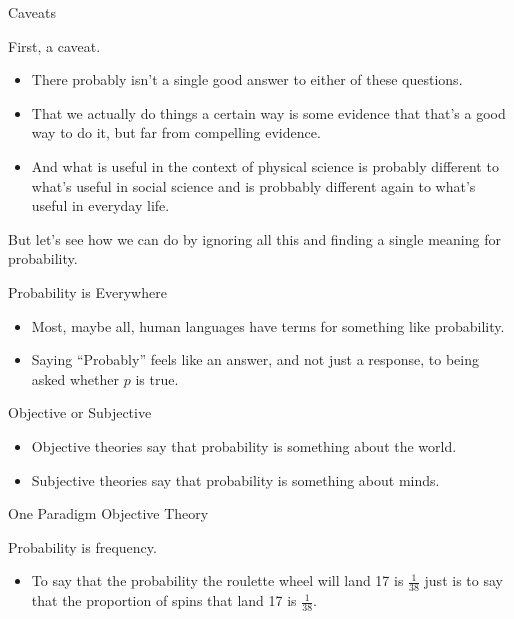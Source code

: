 \documentclass[
  ignorenonframetext,
]{beamer}
\providecommand{\tightlist}{%
  \setlength{\itemsep}{0pt}\setlength{\parskip}{0pt}}
\renewcommand{\,}{\text{, }}
\begin{document}
\begin{frame}{Caveats}
\protect\hypertarget{caveats}{}

First, a caveat.

\begin{itemize}
\tightlist
\item
  There probably isn't a single good answer to either of these
  questions.
\item
  That we actually do things a certain way is some evidence that that's
  a good way to do it, but far from compelling evidence.
\item
  And what is useful in the context of physical science is probably
  different to what's useful in social science and is probbably
  different again to what's useful in everyday life. \pause
\end{itemize}

But let's see how we can do by ignoring all this and finding a single
meaning for probability.

\end{frame}

\begin{frame}{Probability is Everywhere}
\protect\hypertarget{probability-is-everywhere}{}

\begin{itemize}
\tightlist
\item
  Most, maybe all, human languages have terms for something like
  probability. \pause
\item
  Saying ``Probably'' feels like an answer, and not just a response, to
  being asked whether \(p\) is true.
\end{itemize}

\end{frame}

\begin{frame}{Objective or Subjective}
\protect\hypertarget{objective-or-subjective}{}

\begin{itemize}
\tightlist
\item
  Objective theories say that probability is something about the world.
\item
  Subjective theories say that probability is something about minds.
\end{itemize}

\end{frame}

\begin{frame}{One Paradigm Objective Theory}
\protect\hypertarget{one-paradigm-objective-theory}{}

Probability is frequency.

\begin{itemize}
\tightlist
\item
  To say that the probability the roulette wheel will land 17 is
  \(\frac{1}{38}\) just is to say that the proportion of spins that land
  17 is \(\frac{1}{38}\).
\end{itemize}

\end{frame}
\end{document}
